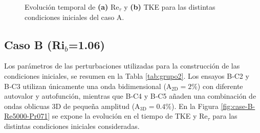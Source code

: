 \begin{figure}[H]
  \centering  

  \caption{Evolución temporal de \textbf{(a)} Re$_{\tau}$ y \textbf{(b)} TKE para las distintas condiciones iniciales del caso A.}
  \label{fig:case-A-Re5000-Pr071}
\end{figure}



\subsection{Caso B (Ri$_b$=1.06)}

Los parámetros de las perturbaciones utilizadas para la construcción de las condiciones iniciales, se resumen en la Tabla \ref{tab:grupo2}. Los ensayos B‑C2 y B‑C3 utilizan únicamente una onda bidimensional ($\text{A}_{\text{2D}}=2 \%$) con diferente autovalor y autofunción, mientras que B‑C4 y B‑C5 añaden una combinación de ondas oblicuas 3D de pequeña amplitud ($\text{A}_{\text{3D}}= 0\text{.}4\%$). En la Figura \ref{fig:case-B-Re5000-Pr071} se expone la evolución en el tiempo de TKE y Re$_{\tau}$ para las distintas condiciones iniciales consideradas.  

